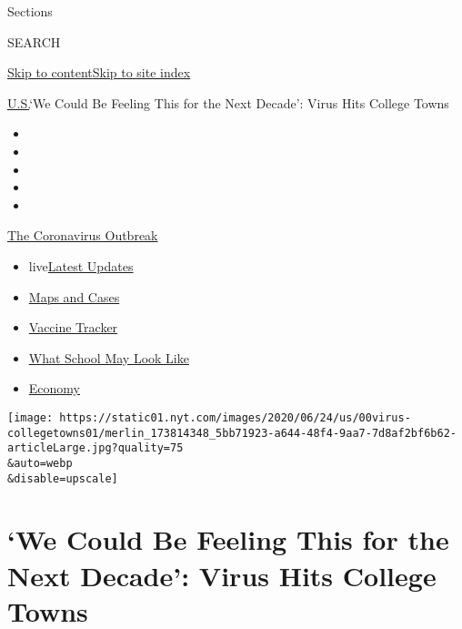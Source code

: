 Sections

SEARCH

\protect\hyperlink{site-content}{Skip to
content}\protect\hyperlink{site-index}{Skip to site index}

\href{/section/us}{U.S.}\textbar{}`We Could Be Feeling This for the Next
Decade': Virus Hits College Towns

\begin{itemize}
\item
\item
\item
\item
\item
\end{itemize}

\href{https://www.nytimes.com/news-event/coronavirus?action=click\&pgtype=Article\&state=default\&region=TOP_BANNER\&context=storylines_menu}{The
Coronavirus Outbreak}

\begin{itemize}
\tightlist
\item
  live\href{https://www.nytimes.com/2020/08/02/world/coronavirus-updates.html?action=click\&pgtype=Article\&state=default\&region=TOP_BANNER\&context=storylines_menu}{Latest
  Updates}
\item
  \href{https://www.nytimes.com/interactive/2020/us/coronavirus-us-cases.html?action=click\&pgtype=Article\&state=default\&region=TOP_BANNER\&context=storylines_menu}{Maps
  and Cases}
\item
  \href{https://www.nytimes.com/interactive/2020/science/coronavirus-vaccine-tracker.html?action=click\&pgtype=Article\&state=default\&region=TOP_BANNER\&context=storylines_menu}{Vaccine
  Tracker}
\item
  \href{https://www.nytimes.com/interactive/2020/07/29/us/schools-reopening-coronavirus.html?action=click\&pgtype=Article\&state=default\&region=TOP_BANNER\&context=storylines_menu}{What
  School May Look Like}
\item
  \href{https://www.nytimes.com/live/2020/07/31/business/stock-market-today-coronavirus?action=click\&pgtype=Article\&state=default\&region=TOP_BANNER\&context=storylines_menu}{Economy}
\end{itemize}

\texttt{[image: https://static01.nyt.com/images/2020/06/24/us/00virus-collegetowns01/merlin\_173814348\_5bb71923-a644-48f4-9aa7-7d8af2bf6b62-articleLarge.jpg?quality=75\\\&auto=webp\\\&disable=upscale]}

\hypertarget{we-could-be-feeling-this-for-the-next-decade-virus-hits-college-towns}{%
\section{`We Could Be Feeling This for the Next Decade': Virus Hits
College
Towns}\label{we-could-be-feeling-this-for-the-next-decade-virus-hits-college-towns}}

